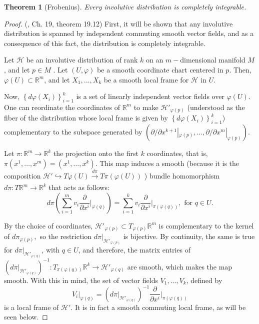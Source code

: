 \documentclass[12pt, letterpaper, reqno]{amsart}
\theoremstyle{definition}
\theoremstyle{plain}
\newtheorem{thm}{Theorem}
\theoremstyle{remark}
\begin{document}
\begin{thm}[Frobenius]
	Every involutive distribution is completely integrable.	
\end{thm}

\begin{proof}
	(\cite{lee2003introduction}, Ch. 19, theorem 19.12) First, it will be shown that any involutive distribution is spanned by independent commuting smooth vector fields, and as a consequence of this fact, the distribution is completely integrable.

	Let $ \mathcal{H} $ be an involutive distribution of rank $ k $ on an $ m- $dimensional manifold $ M $, and let $ p\in M $ . Let $ (U,\varphi) $ be a smooth coordinate chart centered in $ p. $ Then, $ \varphi(U)\subset \mathbb{R}^m $, and let $ X_1,\dots,X_k $ be a smooth local frame for $ \mathcal{H} $ in $ U. $

	Now, $ \left\{ d\varphi \left( X_i \right) \right\}_{i=1}^k $ is a set of linearly independent vector fields over $ \varphi(U). $ One can reordinate the coordinates of $ \mathbb{R}^m $ to make $ \mathcal{H}'_{\varphi(p)} $ (understood as the fiber of the distribution whose local frame is given by $ \left\{ d\varphi \left( X_i \right) \right\}_{i=1}^k $) complementary to the subspace generated by $ \left( \partial/\partial x^{k+1}|_{\varphi(p)},\dots,\partial/\partial x^{m}|_{\varphi(p)} \right). $   

	Let $ \pi: \mathbb{R}^m \rightarrow  \mathbb{R}^k$ the projection onto the first $ k $ coordinates, that is, $ \pi(x^1,\dots,x^m)=(x^1,\dots,x^k). $ This map induces a smooth (because it is the composition $\mathcal{H}' \hookrightarrow T\varphi(U) \xrightarrow[]{d\pi} T\pi(\varphi(U))$ )  bundle homomorphism $ d\pi: T \mathbb{R}^m \rightarrow \mathbb{R}^k	 $ that acts as follows:
	$$ d\pi \left( \sum_{i=1}^m v_i \frac{\partial}{\partial x^i} \Big|_{\varphi(q)}   \right) = \sum_{i=1}^k v_i \frac{\partial}{\partial x^i} \Big|_{\pi(\varphi(q))}, \text{ for }q\in U.$$ 

	By the choice of coordinates, $ \mathcal{H}'_{\varphi(p)}\subset T_{\varphi(p)} \mathbb{R}^m $ is complementary to the kernel of $ d\pi_{\varphi(p)}, $ so the restriction $ d\pi|_{\mathcal{H}'_{\varphi(p)}} $ is bijective. By continuity, the same is true for $ d\pi|_{\mathcal{H}'_{\varphi(q)}} $, with $ q\in U $, and therefore, the matrix entries of $ \left(d\pi|_{\mathcal{H}'_{\varphi(q)}} \right)^{-1}: T_{\pi(\varphi(q))} \mathbb{R}^k \rightarrow \mathcal{H}'_{\varphi(q)}$ are smooth, which makes the map smooth. With this in mind, the set of vector fields $ V_1,\dots,V_k $, defined by
	$$ V_i|_{\varphi(q)}= \left(  d\pi|_{\mathcal{H}'_{\varphi(q)}}  \right)^{-1} \frac{\partial}{\partial x^i} \Big|_{\pi(\varphi(q))} $$ 
	is a local frame of $ \mathcal{H'}. $ It is in fact a smooth commuting local frame, as will be seen below. 


\end{proof}
\end{document}
